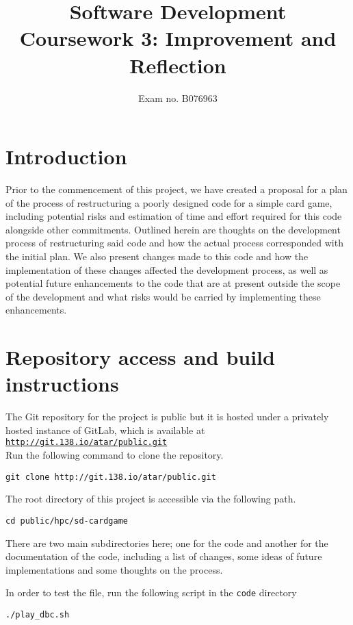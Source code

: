 \documentclass[12pt,a4paper,tightenlines]{article}
\begin{document}
\title{Software Development\\Coursework 3: Improvement and Reflection}
\author{Exam no. B076963}
\date{}
\makeEPCCtitle
\tableofcontents
\listoftables
\newpage
\section{Introduction}
Prior to the commencement of this project, we have created a proposal for
a plan of the process of restructuring a poorly designed code for a simple
card game, including potential risks and estimation of time and effort
required for this code alongside other commitments.
Outlined herein are thoughts on the development process of restructuring
said code and how the actual process corresponded with the 
initial plan. We also present changes made to this code and how the 
implementation of these changes affected the development process, as 
well as potential future enhancements to the code that are at present
outside the scope of the development and what risks would be carried by
implementing these enhancements.

\section{Repository access and build instructions}
The Git repository for the project is public but it is hosted under a
privately hosted instance of GitLab, which is available at 
\texttt{\href{http://git.138.io/atar/public.git}{http://git.138.io/atar/public.git}}\\
Run the following command to clone the repository.
\begin{lstlisting}
git clone http://git.138.io/atar/public.git

\end{lstlisting}

The root directory of this project is accessible via the following 
path.
\begin{lstlisting}
cd public/hpc/sd-cardgame
\end{lstlisting}

There are two main subdirectories here; one for the code and another for 
the documentation of the code, including a list of changes, some ideas
of future implementations and some thoughts on the process.

In order to test the file, run the following script in the \texttt{code}
directory 
\begin{lstlisting}
./play_dbc.sh
\end{lstlisting}
\end{document}
